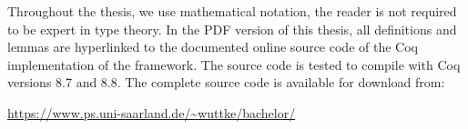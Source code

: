 Throughout the thesis, we use mathematical notation, the reader is not required to be expert in type theory.  In the PDF version of this thesis, all
definitions and lemmas are hyperlinked to the documented online source code of the Coq implementation of the framework.  The source code is tested to
compile with Coq versions 8.7 and 8.8.  The complete source code is available for download from:
\begin{center}
  \url{https://www.ps.uni-saarland.de/~wuttke/bachelor/}
\end{center}

